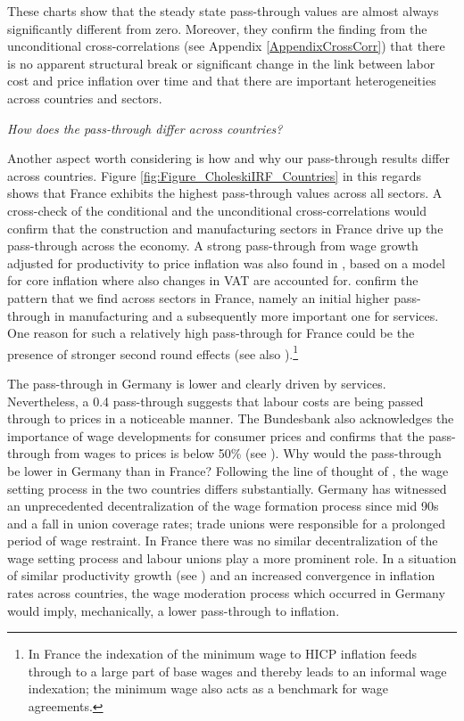 \documentclass[11pt]{article}
\begin{document}
These charts show that the steady state pass-through values are almost always significantly different from zero. Moreover, they confirm the finding from the unconditional cross-correlations (see Appendix \ref{AppendixCrossCorr}) that there is no apparent structural break or significant change in the link between labor cost and price inflation over time and that there are important heterogeneities across countries and sectors. 

\pagebreak


\textit{How does the pass-through differ across countries?} 

Another aspect worth considering is how and why our pass-through results differ across countries. Figure \ref{fig:Figure_CholeskiIRF_Countries} in this regards shows that France exhibits the highest pass-through values across all sectors. A cross-check of the conditional and the unconditional cross-correlations would confirm that the construction and manufacturing sectors in France drive up the pass-through across the economy. A strong pass-through from wage growth adjusted for productivity to price inflation was also found in \cite{INSEE2018}, based on a model for core inflation where also changes in VAT are accounted for. \cite{BdF17} confirm the pattern that we find across sectors in France, namely an initial higher pass-through in manufacturing and a subsequently more important one for services. One reason for such a relatively high pass-through for France could be the presence of stronger second round effects (see also \cite{BdF16}).\footnote{In France the indexation of the minimum wage to HICP inflation feeds through to a large part of base wages and thereby leads to an informal wage indexation; the minimum wage also acts as a benchmark for wage agreements.} 

The pass-through in Germany is lower and clearly driven by services. Nevertheless, a 0.4 pass-through suggests that labour costs are being passed through to prices in a noticeable manner. The Bundesbank also acknowledges the importance of wage developments for consumer prices and confirms that the pass-through from wages to prices is below  50\% (see \cite{Bundesbank18}). Why would the pass-through be lower in Germany than in France? Following the line of thought of \cite{Kugler_18}, the wage setting process in the two countries differs substantially. Germany has witnessed an unprecedented decentralization of the wage formation process since mid 90s and a fall in union coverage rates; trade unions were responsible for a prolonged period of wage restraint. In France there was no similar decentralization of the wage setting process and labour unions play a more prominent role. In a situation of similar productivity growth (see \cite{Kugler_18}) and an increased convergence in inflation rates across countries, the wage moderation process which occurred in Germany would imply, mechanically, a lower pass-through to inflation. 
\end{document}
